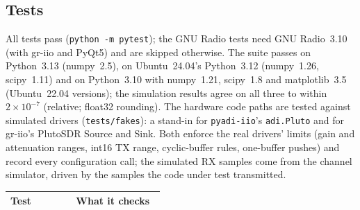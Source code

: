 \documentclass[10pt,a4paper]{article}
\newcommand{\code}[1]{\texttt{#1}}
\begin{document}
\subsection{Tests}
All tests pass (\code{python -m pytest}); the GNU Radio tests need GNU Radio~3.10 (with gr-iio and PyQt5) and are skipped
otherwise. The suite passes on Python~3.13 (numpy~2.5), on Ubuntu~24.04's Python~3.12 (numpy~1.26, scipy~1.11) and on
Python~3.10 with numpy~1.21, scipy~1.8 and matplotlib~3.5 (Ubuntu~22.04 versions); the simulation results agree on all
three to within $2\times10^{-7}$ (relative; float32 rounding). The hardware code paths are tested against simulated drivers (\code{tests/fakes}): a stand-in for
\code{pyadi-iio}'s \code{adi.Pluto} and for gr-iio's PlutoSDR Source and Sink. Both enforce the real drivers' limits
(gain and attenuation ranges, int16 TX range, cyclic-buffer rules, one-buffer pushes) and record every configuration call;
the simulated RX samples come from the channel simulator, driven by the samples the code under test transmitted.
\begin{small}
\begin{longtable}{p{0.40\linewidth}p{0.54\linewidth}}
\toprule
Test & What it checks\\
\midrule
\endhead
\bottomrule
\end{longtable}
\end{small}
\end{document}
